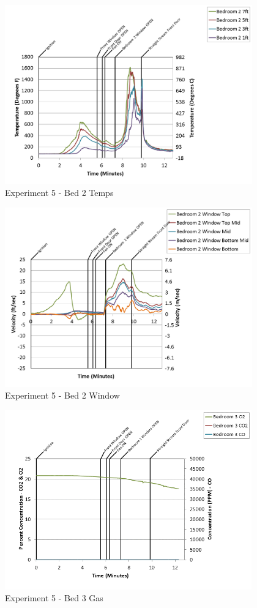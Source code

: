 \documentclass{article}
\begin{document}
\begin{appendices}
\clearpage

\begin{figure}[h!]
	\centering
	\includegraphics[height=3.05in]{0_Images/Results_Charts/Exp_5_Charts/Bed2Temps.png}
	\caption{Experiment 5 - Bed 2 Temps}
\end{figure}


\begin{figure}[h!]
	\centering
	\includegraphics[height=3.05in]{0_Images/Results_Charts/Exp_5_Charts/Bed2Window.png}
	\caption{Experiment 5 - Bed 2 Window}
\end{figure}

\clearpage

\begin{figure}[h!]
	\centering
	\includegraphics[height=3.05in]{0_Images/Results_Charts/Exp_5_Charts/Bed3Gas.png}
	\caption{Experiment 5 - Bed 3 Gas}
\end{figure}



\end{appendices}
\end{document}
